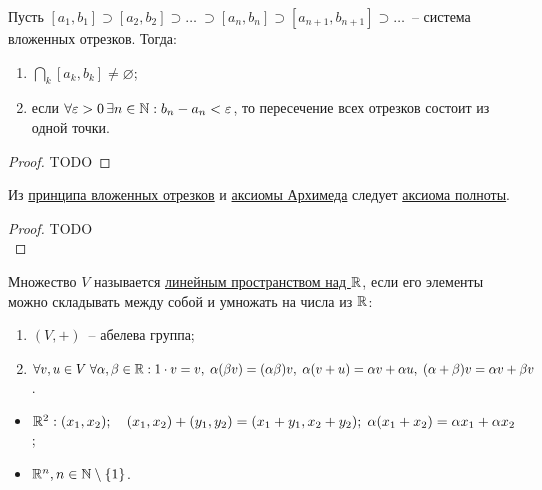 \label{nested_intervals}\begin{theo}
	Пусть $[a_1, b_1] \supset [a_2, b_2] \supset \dots~ \supset [a_n, b_n] \supset [a_{n+1}, b_{n+1}] \supset \dots$~-- система вложенных отрезков. Тогда:
	\begin{enumerate}
		\item $\underset{k}{\bigcap} [a_k, b_k] \neq \varnothing$;
		\item если $\forall \varepsilon > 0\, \exists n \in \mathbb{N}: b_n - a_n < \varepsilon$, то пересечение всех отрезков состоит из одной точки.
	\end{enumerate}
\end{theo}
\begin{proof}
	TODO
\end{proof}

\begin{theo}
	Из \hyperref[nested_intervals]{принципа вложенных отрезков} и \hyperref[axiom_Archimedes]{аксиомы Архимеда} следует \hyperref[axiom_completeness]{аксиома полноты}.
\end{theo}
\begin{proof}
	TODO\\
\end{proof}

\begin{defin}
	Множество $V$ называется \underline{линейным пространством над $\mathbb{R}$}, если его элементы можно складывать между собой и умножать на числа из $\mathbb{R}$:
	\begin{enumerate}
		\item $(V,+)$~-- абелева группа;
		\item $\forall v,u \in V\; \forall \alpha, \beta \in \mathbb{R}: 1 \cdot v = v,\; \alpha(\beta v) = (\alpha \beta)v,\; \alpha(v+u) = \alpha v + \alpha u,\; (\alpha + \beta)v = \alpha v + \beta v$.
	\end{enumerate}
\end{defin}
\begin{ex}
	\begin{itemize}
		\item $\mathbb{R}^2: (x_1, x_2); \quad (x_1, x_2) + (y_1, y_2) = (x_1 + y_1, x_2 + y_2); \; \alpha(x_1 + x_2) = \alpha x_1 + \alpha x_2$;
		\item $\mathbb{R}^n, n \in \mathbb{N} \setminus \{1\}$.\\
	\end{itemize}
\end{ex}

